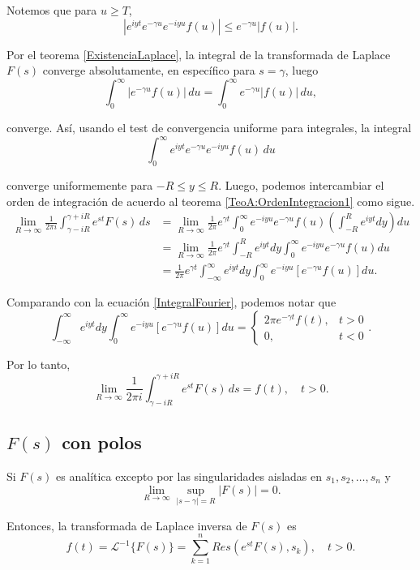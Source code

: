 Notemos que para $u \geq T$,
$$| e^{i y t} e^{-\gamma u} e^{-iy u} f(u)| \leq e^{-\gamma u} |f(u)|.$$

Por el teorema \ref{ExistenciaLaplace}, la integral de la transformada de Laplace $F(s)$ converge absolutamente, en específico para $s = \gamma$, luego
$$\int_0^{\infty} |e^{-\gamma u} f(u)| \,du = \int_0^{\infty} e^{-\gamma u} |f(u)| \,du,$$

converge. Así, usando el test de convergencia uniforme para integrales, la integral 
$$\int_0^{\infty} e^{i y t} e^{-\gamma u} e^{-iy u} f(u) \,du $$

converge uniformemente para $-R \leq y \leq R$. Luego, podemos intercambiar el orden de integración de acuerdo al teorema \ref{TeoA:OrdenIntegracion1} como sigue.
\begin{align*}
   \lim_{R \to \infty} \frac{1}{2\pi i} \int_{\gamma -i R}^{\gamma + i R} e^{st} F(s) \,ds &= \lim_{R \to \infty} \frac{1}{2\pi} e^{\gamma t} \int_{0}^{\infty} e^{-i y u} e^{-\gamma u} f(u) \left( \int_{-R}^R e^{i y t} dy \right) du \\
   &=  \lim_{R \to \infty} \frac{1}{2\pi} e^{\gamma t}  \int_{-R}^R e^{iy t} dy  \int_{0}^{\infty} e^{-i y u} e^{-\gamma u} f(u) du \\
   &= \frac{1}{2\pi} e^{\gamma t}  \int_{-\infty}^{\infty} e^{iyt} dy  \int_{0}^{\infty} e^{-i y u} [e^{-\gamma u} f(u)] du.
\end{align*}

Comparando con la ecuación \eqref{IntegralFourier}, podemos notar que 
$$\int_{-\infty}^{\infty} e^{iy t} dy  \int_{0}^{\infty} e^{-i y u} [e^{-\gamma u} f(u)] du = \left\{ \begin{array}{cl}
     2\pi e^{- \gamma t} f(t),& t > 0  \\
     0,& t < 0
\end{array} \right..$$

Por lo tanto,
$$  \lim_{R \to \infty} \frac{1}{2\pi i} \int_{\gamma -i R}^{\gamma + i R} e^{st} F(s) \,ds = f(t), \quad t > 0.$$

\subsection{\texorpdfstring{$F(s)$}{TEXT} con polos}

\begin{teorema}
    Si $F(s)$ es analítica excepto por las singularidades aisladas en $s_1, s_2, \dots, s_n$ y 
    $$\lim_{R \to \infty} \sup_{ |s - \gamma| = R} |F(s)| =  0.$$
   
   Entonces, la transformada de Laplace inversa de $F(s)$ es
    $$f(t) = \mathcal{L}^{-1}\{F(s)\} = \sum_{k= 1}^n Res(e^{st} F(s), s_k), \quad t > 0.$$
\end{teorema}

